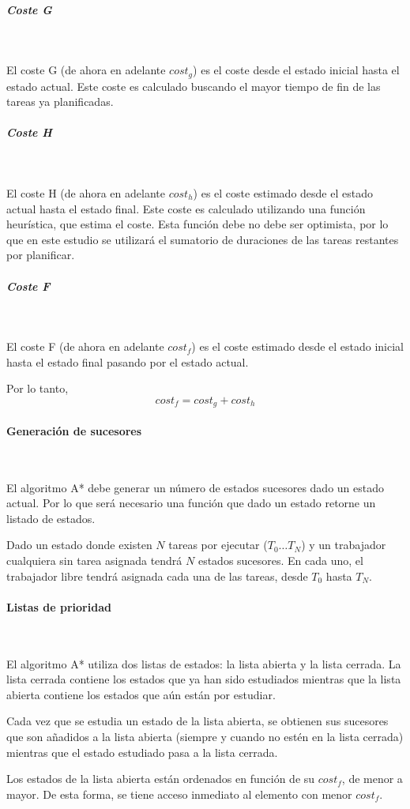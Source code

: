 \subparagraph{Coste G}~

El coste G (de ahora en adelante $cost_g$) es el coste desde el estado inicial
hasta el estado actual.
Este coste es calculado buscando el mayor tiempo de fin de
las tareas ya planificadas.

\subparagraph{Coste H}~

El coste H (de ahora en adelante $cost_h$) es el coste estimado desde el estado actual
hasta el estado final.
Este coste es calculado utilizando una función heurística,
que estima el coste.
Esta función debe no debe ser optimista,
por lo que en este estudio se utilizará el sumatorio de duraciones
de las tareas restantes por planificar.

\subparagraph{Coste F}~

El coste F (de ahora en adelante $cost_f$) es el coste estimado desde el estado inicial
hasta el estado final pasando por el estado actual.

Por lo tanto, $$cost_f = cost_g + cost_h$$

\paragraph{Generación de sucesores}~

El algoritmo A* debe generar un número de estados sucesores dado un estado actual.
Por lo que será necesario una función que dado un estado retorne un listado de estados.

Dado un estado donde existen $N$ tareas por ejecutar ($T_0 \dots T_N$) y
un trabajador cualquiera sin tarea asignada tendrá $N$ estados sucesores.
En cada uno, el trabajador libre tendrá asignada cada una de las tareas,
desde $T_0$ hasta $T_N$.

\paragraph{Listas de prioridad}~

El algoritmo A* utiliza dos listas de estados: la lista abierta y la lista cerrada.
La lista cerrada contiene los estados que ya han sido estudiados mientras que
la lista abierta contiene los estados que aún están por estudiar.

Cada vez que se estudia un estado de la lista abierta,
se obtienen sus sucesores que son añadidos a la lista abierta
(siempre y cuando no estén en la lista cerrada)
mientras que el estado estudiado pasa a la lista cerrada.

Los estados de la lista abierta están ordenados en función de su $cost_f$,
de menor a mayor.
De esta forma, se tiene acceso inmediato al elemento con menor $cost_f$.

